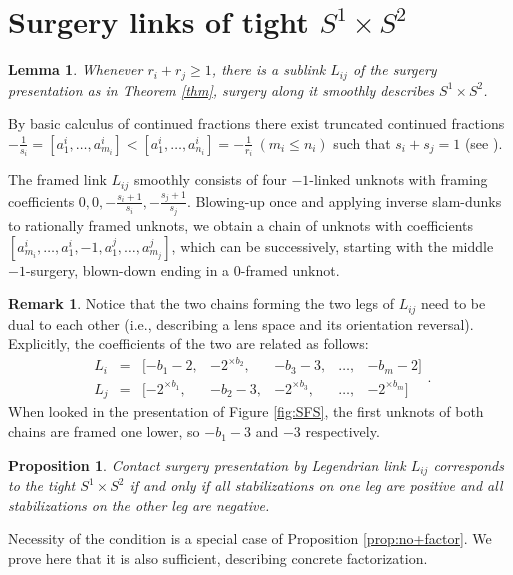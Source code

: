 \documentclass{amsart}
\newtheorem{prop}[thm]{Proposition}
\newtheorem{lem}[thm]{Lemma}
\theoremstyle{definition}
\newtheorem{remark}[thm]{Remark}
\begin{document}
\section{Surgery links of tight $S^1\times S^2$}\label{Sec3}
\begin{lem}
Whenever $r_i+r_j\geq 1$, there is a sublink $L_{ij}$ of the surgery presentation as in Theorem \ref{thm}, surgery along it smoothly describes $S^1\times S^2$.
\end{lem}

\proof
By basic calculus of continued fractions there exist truncated continued fractions $-\frac{1}{s_i}=[a_1^i,\dots,a_{m_i}^i]<[a_1^i,\dots,a_{n_i}^i]=-\frac{1}{r_i}\ (m_i\leq n_i)$ such that $s_i+s_j=1$ (see \cite[Lemma 3.2]{LL}).

The framed link $L_{ij}$ smoothly consists of four $-1$-linked unknots with framing coefficients $0,0,-\frac{s_i+1}{s_i},-\frac{s_j+1}{s_j}$. Blowing-up once and applying inverse slam-dunks to rationally framed unknots, we obtain a chain of unknots with coefficients $[a_{m_i}^i,\dots,a_1^i,-1,a_1^j,\dots,a_{m_j}^j]$, which can be successively, starting with the middle $-1$-surgery, blown-down ending in a $0$-framed unknot.
\endproof

\begin{remark}\label{rmk:dual}
Notice that the two chains forming the two legs of $L_{ij}$ need to be dual to each other (i.e., describing a lens space and its orientation reversal). Explicitly, the coefficients of the two are related as follows: $$\begin{array}{llccccc}L_i&=&[-b_1-2,&-2^{\times b_2},& -b_3-3,&\dots,&-b_m-2]\\ L_j&=&[-2^{\times b_1},&-b_2-3,&-2^{\times b_3},&\dots,& -2^{\times b_m}]\end{array}.$$ When looked in the presentation of Figure \ref{fig:SFS}, the first unknots of both chains are framed one lower, so $-b_1-3$ and $-3$ respectively.
\end{remark}

\begin{prop}\label{prop:+factor}
Contact surgery presentation by Legendrian link $L_{ij}$ corresponds to the tight $S^1\times S^2$ if and only if all stabilizations on one leg are positive and all stabilizations on the other leg are negative.
\end{prop}

\proof
Necessity of the condition is a special case of Proposition \ref{prop:no+factor}. We prove here that it is also sufficient, describing concrete factorization.
\end{document}
